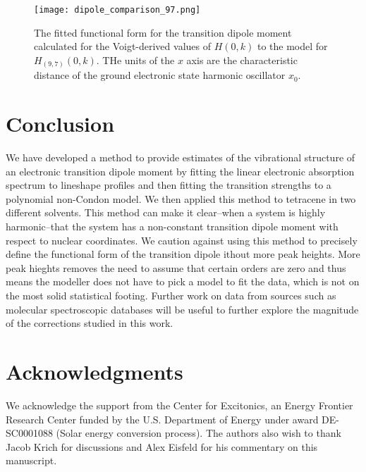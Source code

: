 \begin{figure}
   \texttt{[image: dipole\_comparison\_97.png]}
   \caption{The fitted functional form for the transition dipole moment calculated for the Voigt-derived values of $H(0,k)$ to the model for $H_{(9,7)}(0,k)$.  THe units of the $x$ axis are the characteristic distance of the ground electronic state harmonic oscillator $x_0$.}
	\label{fig:mu_fit_comparison}
\end{figure}


\section{Conclusion}
We have developed a method to provide estimates of the vibrational structure of an electronic transition dipole moment by fitting the linear electronic absorption spectrum to lineshape profiles and then fitting the transition strengths to a polynomial non-Condon model.  We then applied this method to tetracene in two different solvents.  This method can make it clear--when a system is highly harmonic--that the system has a non-constant transition dipole moment with respect to nuclear coordinates.  We caution against using this method to precisely define the functional form of the transition dipole ithout more peak heights.  More peak hieghts removes the need to assume that certain orders are zero and thus means the modeller does not have to pick a model to fit the data, which is not on the most solid statistical footing. Further work on data from sources such as molecular spectroscopic databases will be useful to further explore the magnitude of the corrections studied in this work.


\section{Acknowledgments}
We acknowledge the support from the Center for Excitonics, an Energy Frontier Research Center funded by the U.S. Department of Energy under award DE-SC0001088 (Solar energy conversion process).  The authors also wish to thank Jacob Krich for discussions and Alex Eisfeld for his commentary on this manuscript.
